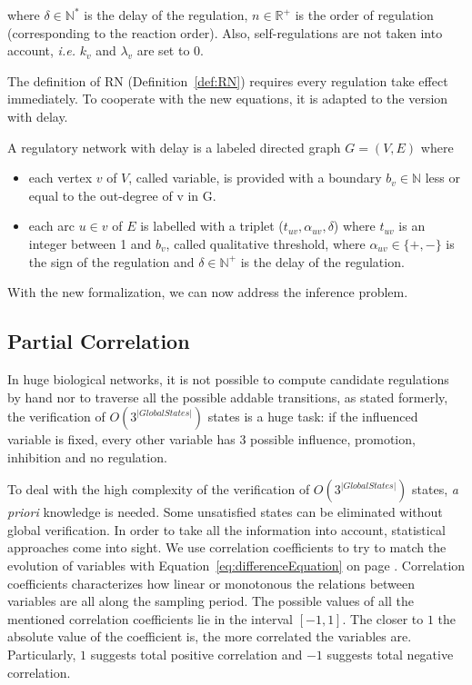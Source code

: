 where $\delta\in \mathbb{N}^{*}$ is the delay of the regulation, $n\in \mathbb{R}^{+}$ is the order of regulation (corresponding to the reaction order).
Also, self-regulations are not taken into account, \textit{i.e.} $k_v$ and $\lambda_v$ are set to 0.

The definition of RN (Definition~\ref{def:RN}) requires every regulation take effect immediately.
To cooperate with the new equations, it is adapted to the version with delay.

\begin{definition}
A regulatory network with delay is a labeled directed graph $G=(V,E)$ where 
\begin{itemize}
    \item each vertex $v$ of $V$, called variable, is provided with a boundary $b_v\in \mathbb{N}$ less or equal to the out-degree of v in G.
    \item each arc $u\in v$ of $E$ is labelled with a triplet ($t_{uv}, \alpha_{uv}, \delta$) where $t_{uv}$ is an integer between 1 and $b_v$, called qualitative threshold, where $\alpha_{uv}\in \{+,-\}$ is the sign of the regulation and $\delta\in \mathbb{N^+}$ is the delay of the regulation.
\end{itemize}
\end{definition}

With the new formalization, we can now address the inference problem.

\subsection{Partial Correlation}

In huge biological networks, it is not possible to compute candidate regulations by hand nor to traverse all the possible addable transitions, as stated formerly, the verification of $O(3^{|Global States|})$ states is a huge task: if the influenced variable is fixed, every other variable has 3 possible influence, promotion, inhibition and no regulation.
 
To deal with the high complexity of the verification of $O(3^{|Global States|})$ states, \textit{a priori} knowledge is needed. 
Some unsatisfied states can be eliminated without global verification.  
In order to take all the information into account, statistical approaches come into sight.
We use correlation coefficients to try to match the evolution of variables with Equation~\ref{eq:differenceEquation} on page \pageref{eq:differenceEquation}.
Correlation coefficients characterizes how linear or monotonous the relations between variables are all along the sampling period.
The possible values of all the mentioned correlation coefficients lie in the interval $[-1,1]$.
The closer to $1$ the absolute value of the coefficient is, the more correlated the variables are.
Particularly, $1$ suggests total positive correlation and $-1$ suggests total negative correlation. 

